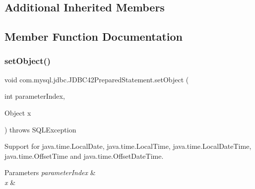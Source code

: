 \subsection*{Additional Inherited Members}


\subsection{Member Function Documentation}
\mbox{\label{classcom_1_1mysql_1_1jdbc_1_1_j_d_b_c42_prepared_statement_a46b5e2046e9ffeed2aaba0002fd240cf}} 
\subsubsection{\texorpdfstring{set\+Object()}{setObject()}\hspace{0.1cm}{\footnotesize\ttfamily [1/5]}}
{\footnotesize\ttfamily void com.\+mysql.\+jdbc.\+J\+D\+B\+C42\+Prepared\+Statement.\+set\+Object (\begin{DoxyParamCaption}\item[{int}]{parameter\+Index,  }\item[{Object}]{x }\end{DoxyParamCaption}) throws S\+Q\+L\+Exception}

Support for java.\+time.\+Local\+Date, java.\+time.\+Local\+Time, java.\+time.\+Local\+Date\+Time, java.\+time.\+Offset\+Time and java.\+time.\+Offset\+Date\+Time.


\begin{DoxyParams}{Parameters}
{\em parameter\+Index} & \\
\hline
{\em x} & \\
\hline
\end{DoxyParams}

